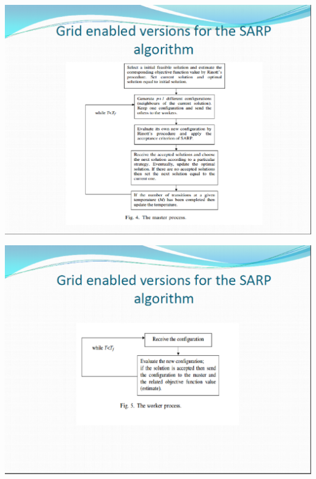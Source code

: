 \documentclass[spanish,a4paper,11pt,twoside]{report}
\begin{document}

\begin{center}
\includegraphics[width=1\textwidth]{images/pic9.eps}\\[0.25cm]
\end{center}
\begin{center}
\includegraphics[width=1\textwidth]{images/pic10.eps}\\[0.25cm]
\end{center}
\end{document}
